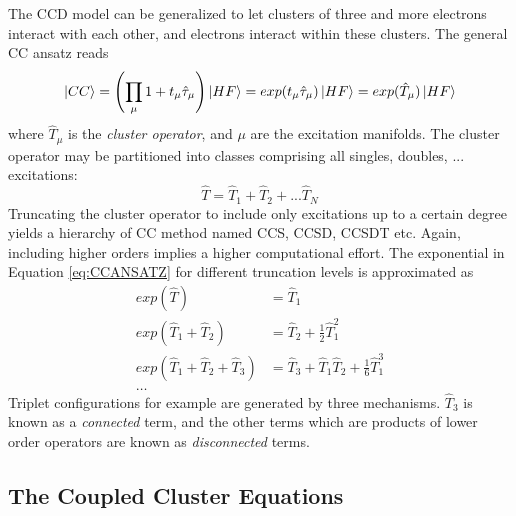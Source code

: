 The CCD model can be generalized to let clusters of three and more electrons interact with each other, and electrons interact within these clusters. The general CC ansatz reads
\begin{equation}
\ket{CC} = \left( \prod_{\mu} 1 + t_{\mu}\hat{\tau}_{\mu} \right) \ket{HF} = exp(t_{\mu}\hat{\tau}_{\mu}) \ket{HF} = exp(\hat{T}_{\mu}) \ket{HF}
\label{eq:CCANSATZ}
\end{equation}
\noindent where $\hat{T}_{\mu}$ is the \emph{cluster operator}, and $\mu$ are the excitation manifolds. The cluster operator may be partitioned into classes comprising all singles, doubles, ... excitations:
\begin{equation}
\hat{T} = \hat{T}_1 + \hat{T}_2 + ... \hat{T}_N
\end{equation}
\noindent Truncating the cluster operator to include only excitations up to a certain degree yields a hierarchy of CC method named CCS, CCSD, CCSDT etc. Again, including higher orders implies a higher computational effort. The exponential in Equation \ref{eq:CCANSATZ} for different truncation levels is approximated as
\begin{align}
exp(\hat{T}) &= \hat{T}_1 \\
exp(\hat{T}_1 + \hat{T}_2) &= \hat{T}_2 + \frac{1}{2} \hat{T}_1^2 \\
exp(\hat{T}_1 + \hat{T}_2 + \hat{T}_3) &= \hat{T}_3 + \hat{T}_1 \hat{T}_2 + \frac{1}{6} \hat{T}_1^3 \\
\ldots \nonumber
\end{align}
\noindent Triplet configurations for example are generated by three mechanisms. $\hat{T}_3$ is known as a \emph{connected} term, and the other terms which are products of lower order operators are known as \emph{disconnected} terms. 

\subsection{The Coupled Cluster Equations} 

